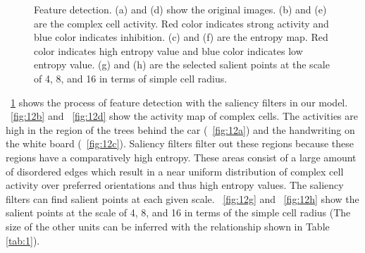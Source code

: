 \documentclass[conference]{IEEEtran}
\begin{document}
\begin{figure}[htp]
\hfil
{}
\caption{Feature detection. (a) and (d) show the original images.
(b) and (e) are the complex cell activity. 
Red color indicates strong activity and blue color indicates inhibition.
(c) and (f) are the entropy map.
Red color indicates high entropy value and blue color indicates low entropy value.
(g) and (h) are the selected salient points
at the scale of 4, 8, and 16 in terms of simple cell radius.}
\label{fig:12}
\end{figure}

\figurename~\ref{fig:12} shows the process of feature detection with the saliency filters in our model.
\figurename~\ref{fig:12b} and \figurename~\ref{fig:12d} show the activity map of complex cells.
The activities are high in the region of the trees behind the car (\figurename~\ref{fig:12a})
and the handwriting on the white board (\figurename~\ref{fig:12c}).
Saliency filters filter out these regions because these regions have a comparatively high entropy.
These areas consist of a large amount of disordered edges
which result in a near uniform distribution of complex cell activity over preferred orientations
and thus high entropy values.
The saliency filters can find salient points at each given scale.
\figurename~\ref{fig:12g} and \figurename~\ref{fig:12h} show the salient points
at the scale of 4, 8, and 16 in terms of the simple cell radius
(The size of the other units can be inferred with the relationship
shown in Table \ref{tab:1}).
\end{document}
